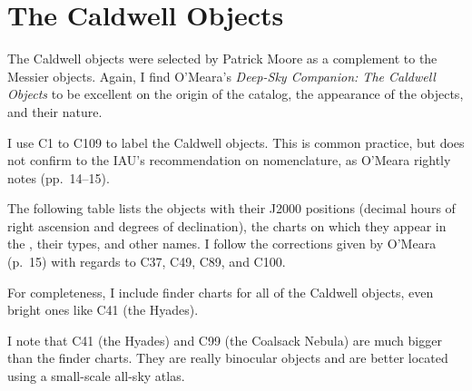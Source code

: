 
\chapter*{The Caldwell Objects}

The Caldwell objects were selected by Patrick Moore as a complement to the Messier objects. Again, I find O’Meara’s \emph{Deep-Sky Companion: The Caldwell Objects} to be excellent on the origin of the catalog, the appearance of the objects, and their nature.

I use C1 to C109 to label the Caldwell objects. This is common practice, but does not confirm to the IAU’s recommendation on nomenclature, as O’Meara rightly notes (pp.\ 14--15).

The following table lists the objects with their J2000 positions (decimal hours of right ascension and degrees of declination), the charts on which they appear in the {\PSA}, their types, and other names. I follow the corrections given by O’Meara (p.\ 15) with regards to C37, C49, C89, and C100.

For completeness, I include finder charts for all of the Caldwell objects, even bright ones like C41 (the Hyades).

I note that C41 (the Hyades) and C99 (the Coalsack Nebula) are much bigger than the finder charts. They are really binocular objects and are better located using a small-scale all-sky atlas.


\clearpage

